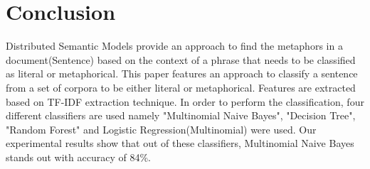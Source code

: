 \documentclass[a4paper]{article}
\begin{document}
\section{Conclusion}
Distributed Semantic Models provide an approach to find the metaphors in a document(Sentence) based on the context of a phrase that needs to be classified as literal or metaphorical. This paper features an approach to classify a sentence from a set of corpora to be either literal or metaphorical. Features are extracted based on TF-IDF extraction technique. In order to perform the classification, four different classifiers are used namely "Multinomial Naive Bayes", "Decision Tree", "Random Forest" and Logistic Regression(Multinomial) were used. Our experimental results show that out of these classifiers, Multinomial Naive Bayes stands out with accuracy of 84\%. 
\\
\end{document}
